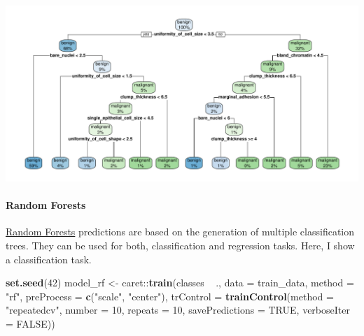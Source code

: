 \documentclass[]{article}
\newenvironment{Shaded}{\begin{snugshade}}{\end{snugshade}}
\newcommand{\KeywordTok}[1]{\textcolor[rgb]{0.13,0.29,0.53}{\textbf{{#1}}}}
\newcommand{\DataTypeTok}[1]{\textcolor[rgb]{0.13,0.29,0.53}{{#1}}}
\newcommand{\DecValTok}[1]{\textcolor[rgb]{0.00,0.00,0.81}{{#1}}}
\newcommand{\StringTok}[1]{\textcolor[rgb]{0.31,0.60,0.02}{{#1}}}
\newcommand{\OtherTok}[1]{\textcolor[rgb]{0.56,0.35,0.01}{{#1}}}
\newcommand{\NormalTok}[1]{{#1}}
\let\oldparagraph\paragraph
\renewcommand{\paragraph}[1]{\oldparagraph{#1}\mbox{}}
\begin{document}
\begin{center}\includegraphics{webinar_code_files/figure-latex/decision_tree-1} \end{center}

\paragraph{Random Forests}\label{random-forests}

\href{https://www.stat.berkeley.edu/~breiman/RandomForests/cc_home.htm}{Random
Forests} predictions are based on the generation of multiple
classification trees. They can be used for both, classification and
regression tasks. Here, I show a classification task.

\begin{Shaded}
\begin{Highlighting}[]
\KeywordTok{set.seed}\NormalTok{(}\DecValTok{42}\NormalTok{)}
\NormalTok{model_rf <-}\StringTok{ }\NormalTok{caret::}\KeywordTok{train}\NormalTok{(classes ~}\StringTok{ }\NormalTok{.,}
                         \DataTypeTok{data =} \NormalTok{train_data,}
                         \DataTypeTok{method =} \StringTok{"rf"}\NormalTok{,}
                         \DataTypeTok{preProcess =} \KeywordTok{c}\NormalTok{(}\StringTok{"scale"}\NormalTok{, }\StringTok{"center"}\NormalTok{),}
                         \DataTypeTok{trControl =} \KeywordTok{trainControl}\NormalTok{(}\DataTypeTok{method =} \StringTok{"repeatedcv"}\NormalTok{, }
                                                  \DataTypeTok{number =} \DecValTok{10}\NormalTok{, }
                                                  \DataTypeTok{repeats =} \DecValTok{10}\NormalTok{, }
                                                  \DataTypeTok{savePredictions =} \OtherTok{TRUE}\NormalTok{, }
                                                  \DataTypeTok{verboseIter =} \OtherTok{FALSE}\NormalTok{))}
\end{Highlighting}
\end{Shaded}
\end{document}
